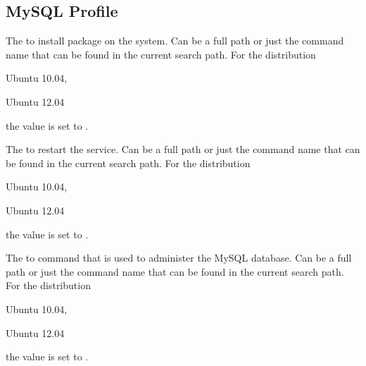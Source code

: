\label{sec:mysql_profile}
\subsection{MySQL Profile}


The  to install package on the system. Can be a full path or
just the command name that can be found in the current search path. 
For the distribution
\begin{inparaitem}
\item[\TheDistribution{ubuntu}] Ubuntu 10.04,
\item[\TheDistribution{ubuntu}] Ubuntu 12.04
\end{inparaitem}
the value is set to .


The  to restart the service. Can be a full path or
just the command name that can be found in the current search path. 
For the distribution
\begin{inparaitem}
\item[\TheDistribution{ubuntu}] Ubuntu 10.04,
\item[\TheDistribution{ubuntu}] Ubuntu 12.04
\end{inparaitem}
the value is set to .


The  to  command that is used to administer the 
MySQL database. Can be a full path or
just the command name that can be found in the current search path. 
For the distribution
\begin{inparaitem}
\item[\TheDistribution{ubuntu}] Ubuntu 10.04,
\item[\TheDistribution{ubuntu}] Ubuntu 12.04
\end{inparaitem}
the value is set to .

